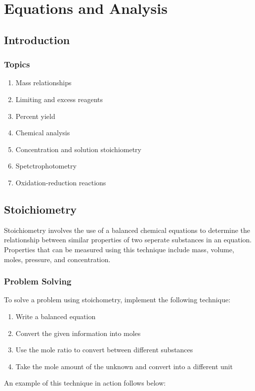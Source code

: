 \chapter{Equations and Analysis}
\section{Introduction}
\subsection{Topics}
\begin{enumerate}
  \item Mass relationships
  \item Limiting and excess reagents
  \item Percent yield
  \item Chemical analysis
  \item Concentration and solution stoichiometry
  \item Spetctrophotometry
  \item Oxidation-reduction reactions
\end{enumerate}

\section{Stoichiometry}
Stoichiometry involves the use of a balanced chemical equations to determine
the relationship between similar properties of two seperate substances in an
equation. Properties that can be measured using this technique include mass,
volume, moles, pressure, and concentration.

\subsection{Problem Solving}
To solve a problem using stoichometry, implement the following technique:
\begin{enumerate}
  \item Write a balanced equation
  \item Convert the given information into moles
  \item Use the mole ratio to convert between different substances
  \item Take the mole amount of the unknown and convert into a different unit
\end{enumerate}

An example of this technique in action follows below:

